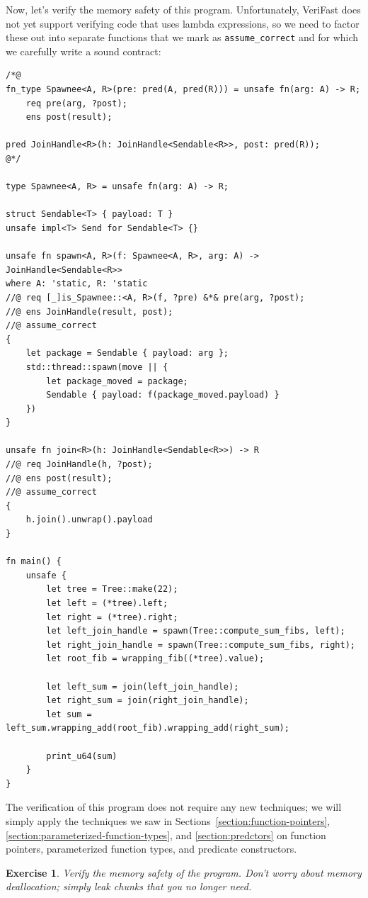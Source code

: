\documentclass{article}
\newtheorem{exercise}{Exercise}
\begin{document}
Now, let's verify the memory safety of this program. Unfortunately, VeriFast does
not yet support verifying code that uses lambda expressions, so we need to factor
these out into separate functions that we mark as \lstinline|assume_correct| and
for which we carefully write a sound contract:
\begin{lstlisting}
/*@
fn_type Spawnee<A, R>(pre: pred(A, pred(R))) = unsafe fn(arg: A) -> R;
    req pre(arg, ?post);
    ens post(result);

pred JoinHandle<R>(h: JoinHandle<Sendable<R>>, post: pred(R));
@*/

type Spawnee<A, R> = unsafe fn(arg: A) -> R;

struct Sendable<T> { payload: T }
unsafe impl<T> Send for Sendable<T> {}

unsafe fn spawn<A, R>(f: Spawnee<A, R>, arg: A) -> JoinHandle<Sendable<R>>
where A: 'static, R: 'static
//@ req [_]is_Spawnee::<A, R>(f, ?pre) &*& pre(arg, ?post);
//@ ens JoinHandle(result, post);
//@ assume_correct
{
    let package = Sendable { payload: arg };
    std::thread::spawn(move || {
        let package_moved = package;
        Sendable { payload: f(package_moved.payload) }
    })
}

unsafe fn join<R>(h: JoinHandle<Sendable<R>>) -> R
//@ req JoinHandle(h, ?post);
//@ ens post(result);
//@ assume_correct
{
    h.join().unwrap().payload
}

fn main() {
    unsafe {
        let tree = Tree::make(22);
        let left = (*tree).left;
        let right = (*tree).right;
        let left_join_handle = spawn(Tree::compute_sum_fibs, left);
        let right_join_handle = spawn(Tree::compute_sum_fibs, right);
        let root_fib = wrapping_fib((*tree).value);

        let left_sum = join(left_join_handle);
        let right_sum = join(right_join_handle);
        let sum = left_sum.wrapping_add(root_fib).wrapping_add(right_sum);
        
        print_u64(sum)
    }
}
\end{lstlisting}

The
verification of this program does not require any new
techniques; we will simply apply the techniques we saw in
Sections~\ref{section:function-pointers}, \ref{section:parameterized-function-types}, and \ref{section:predctors}
on function pointers,
parameterized function types, and predicate constructors.

\begin{exercise}\label{exercise:threads}
Verify the memory safety of the program. Don't worry about memory deallocation;
simply leak chunks that you no longer need.
\end{exercise}
\end{document}
